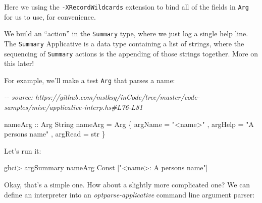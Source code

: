 \documentclass[]{article}
\newenvironment{Shaded}{}{}
\newcommand{\CommentTok}[1]{\textcolor[rgb]{0.38,0.63,0.69}{\textit{#1}}}
\newcommand{\DataTypeTok}[1]{\textcolor[rgb]{0.56,0.13,0.00}{#1}}
\newcommand{\NormalTok}[1]{#1}
\newcommand{\OperatorTok}[1]{\textcolor[rgb]{0.40,0.40,0.40}{#1}}
\newcommand{\OtherTok}[1]{\textcolor[rgb]{0.00,0.44,0.13}{#1}}
\newcommand{\StringTok}[1]{\textcolor[rgb]{0.25,0.44,0.63}{#1}}
\begin{document}
Here we using the \texttt{-XRecordWildcards} extension to bind all of the fields
in \texttt{Arg} for us to use, for convenience.

We build an ``action'' in the \texttt{Summary} type, where we just log a single
help line. The \texttt{Summary} Applicative is a data type containing a list of
strings, where the sequencing of \texttt{Summary} actions is the appending of
those strings together. More on this later!

For example, we'll make a test \texttt{Arg} that parses a name:

\begin{Shaded}
\begin{Highlighting}[]
\CommentTok{{-}{-} source: https://github.com/mstksg/inCode/tree/master/code{-}samples/misc/applicative{-}interp.hs\#L76{-}L81}

\OtherTok{nameArg ::} \DataTypeTok{Arg} \DataTypeTok{String}
\NormalTok{nameArg }\OtherTok{=} \DataTypeTok{Arg}
\NormalTok{    \{ argName }\OtherTok{=} \StringTok{"<name>"}
\NormalTok{    , argHelp }\OtherTok{=} \StringTok{"A person\textquotesingle{}s name"}
\NormalTok{    , argRead }\OtherTok{=}\NormalTok{ str}
\NormalTok{    \}}
\end{Highlighting}
\end{Shaded}

Let's run it:

\begin{Shaded}
\begin{Highlighting}[]
\NormalTok{ghci}\OperatorTok{>}\NormalTok{ argSummary nameArg}
\DataTypeTok{Const}\NormalTok{ [}\StringTok{"<name>: A person\textquotesingle{}s name"}\NormalTok{]}
\end{Highlighting}
\end{Shaded}

Okay, that's a simple one. How about a slightly more complicated one? We can
define an interpreter into an \emph{optparse-applicative} command line argument
parser:

\begin{Shaded}
\end{Shaded}
\end{document}
